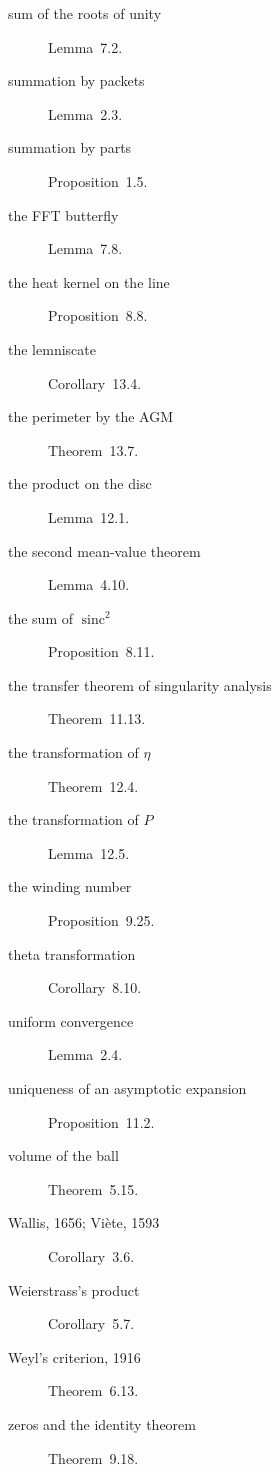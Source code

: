 \begin{description}
\item[sum of the roots of unity] Lemma~7.2.
\item[summation by packets] Lemma~2.3.
\item[summation by parts] Proposition~1.5.
\item[the FFT butterfly] Lemma~7.8.
\item[the heat kernel on the line] Proposition~8.8.
\item[the lemniscate] Corollary~13.4.
\item[the perimeter by the AGM] Theorem~13.7.
\item[the product on the disc] Lemma~12.1.
\item[the second mean-value theorem] Lemma~4.10.
\item[the sum of $\operatorname{sinc}^2$] Proposition~8.11.
\item[the transfer theorem of singularity analysis] Theorem~11.13.
\item[the transformation of $\eta$] Theorem~12.4.
\item[the transformation of $P$] Lemma~12.5.
\item[the winding number] Proposition~9.25.
\item[theta transformation] Corollary~8.10.
\item[uniform convergence] Lemma~2.4.
\item[uniqueness of an asymptotic expansion] Proposition~11.2.
\item[volume of the ball] Theorem~5.15.
\item[Wallis, 1656; Vi\`ete, 1593] Corollary~3.6.
\item[Weierstrass's product] Corollary~5.7.
\item[Weyl's criterion, 1916] Theorem~6.13.
\item[zeros and the identity theorem] Theorem~9.18.
\end{description}
